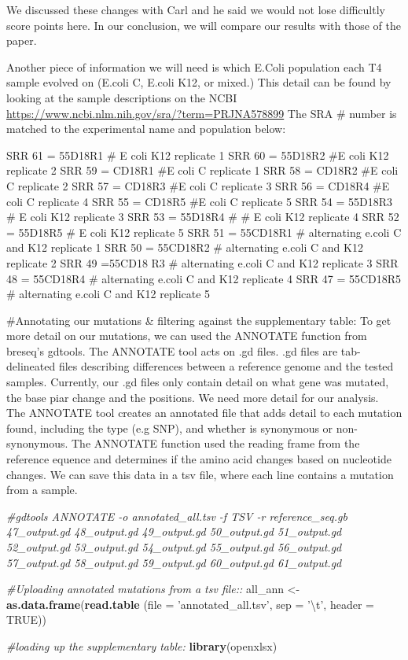\documentclass[
]{article}
\newenvironment{Shaded}{\begin{snugshade}}{\end{snugshade}}
\newcommand{\CharTok}[1]{\textcolor[rgb]{0.31,0.60,0.02}{#1}}
\newcommand{\CommentTok}[1]{\textcolor[rgb]{0.56,0.35,0.01}{\textit{#1}}}
\newcommand{\DataTypeTok}[1]{\textcolor[rgb]{0.13,0.29,0.53}{#1}}
\newcommand{\KeywordTok}[1]{\textcolor[rgb]{0.13,0.29,0.53}{\textbf{#1}}}
\newcommand{\NormalTok}[1]{#1}
\newcommand{\OtherTok}[1]{\textcolor[rgb]{0.56,0.35,0.01}{#1}}
\newcommand{\StringTok}[1]{\textcolor[rgb]{0.31,0.60,0.02}{#1}}
\begin{document}
We discussed these changes with Carl and he said we would not lose
difficultly score points here. In our conclusion, we will compare our
results with those of the paper.

Another piece of information we will need is which E.Coli population
each T4 sample evolved on (E.coli C, E.coli K12, or mixed.) This detail
can be found by looking at the sample descriptions on the NCBI
\url{https://www.ncbi.nlm.nih.gov/sra/?term=PRJNA578899} The SRA \#
number is matched to the experimental name and population below:

SRR 61 = 55D18R1 \# E coli K12 replicate 1 SRR 60 = 55D18R2 \#E coli K12
replicate 2 SRR 59 = CD18R1 \#E coli C replicate 1 SRR 58 = CD18R2 \#E
coli C replicate 2 SRR 57 = CD18R3 \#E coli C replicate 3 SRR 56 =
CD18R4 \#E coli C replicate 4 SRR 55 = CD18R5 \#E coli C replicate 5 SRR
54 = 55D18R3 \# E coli K12 replicate 3 SRR 53 = 55D18R4 \# \# E coli K12
replicate 4 SRR 52 = 55D18R5 \# E coli K12 replicate 5 SRR 51 = 55CD18R1
\# alternating e.coli C and K12 replicate 1 SRR 50 = 55CD18R2 \#
alternating e.coli C and K12 replicate 2 SRR 49 =55CD18 R3 \#
alternating e.coli C and K12 replicate 3 SRR 48 = 55CD18R4 \#
alternating e.coli C and K12 replicate 4 SRR 47 = 55CD18R5 \#
alternating e.coli C and K12 replicate 5

\#Annotating our mutations \& filtering against the supplementary table:
To get more detail on our mutations, we can used the ANNOTATE function
from breseq's gdtools. The ANNOTATE tool acts on .gd files. .gd files
are tab-delineated files describing differences between a reference
genome and the tested samples. Currently, our .gd files only contain
detail on what gene was mutated, the base piar change and the positions.
We need more detail for our analysis.\\
The ANNOTATE tool creates an annotated file that adds detail to each
mutation found, including the type (e.g SNP), and whether is synonymous
or non-synonymous. The ANNOTATE function used the reading frame from the
reference equence and determines if the amino acid changes based on
nucleotide changes. We can save this data in a tsv file, where each line
contains a mutation from a sample.

\begin{Shaded}
\begin{Highlighting}[]
\CommentTok{#gdtools ANNOTATE -o annotated_all.tsv -f TSV -r reference_seq.gb 47_output.gd 48_output.gd 49_output.gd 50_output.gd 51_output.gd 52_output.gd 53_output.gd 54_output.gd 55_output.gd 56_output.gd 57_output.gd 58_output.gd 59_output.gd 60_output.gd 61_output.gd}

\CommentTok{#Uploading annotated mutations from a tsv file:: }
\NormalTok{all_ann <-}\StringTok{ }\KeywordTok{as.data.frame}\NormalTok{(}\KeywordTok{read.table}\NormalTok{ (}\DataTypeTok{file =} \StringTok{'annotated_all.tsv'}\NormalTok{, }\DataTypeTok{sep =} \StringTok{'}\CharTok{\textbackslash{}t}\StringTok{'}\NormalTok{, }\DataTypeTok{header =} \OtherTok{TRUE}\NormalTok{))}

\CommentTok{#loading up the supplementary table: }
\KeywordTok{library}\NormalTok{(openxlsx)}
\end{Highlighting}
\end{Shaded}
\end{document}
